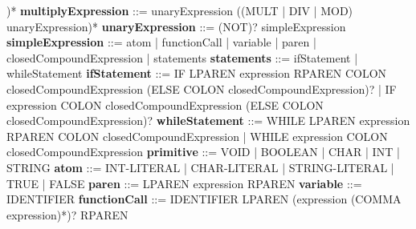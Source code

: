                                                   )*
\newline 
{\bf multiplyExpression}          ::= unaryExpression ((MULT | DIV | MOD) unaryExpression)*
\newline 
{\bf unaryExpression}             ::= (NOT)? simpleExpression
\newline   
{\bf simpleExpression}            ::= atom
                                    | functionCall
                                    | variable
                                    | paren
                                    | closedCompoundExpression
                                    | statements
\newline 
{\bf statements}                  ::= ifStatement
                                    | whileStatement
\newline 
{\bf ifStatement}                 ::= IF LPAREN expression RPAREN COLON closedCompoundExpression (ELSE COLON closedCompoundExpression)? 
                                    | IF expression COLON closedCompoundExpression (ELSE COLON closedCompoundExpression)?
\newline     
{\bf whileStatement}              ::= WHILE LPAREN expression RPAREN COLON closedCompoundExpression
                                    | WHILE expression COLON closedCompoundExpression
\newline    
{\bf primitive}                   ::= VOID
                                    | BOOLEAN
                                    | CHAR
                                    | INT
                                    | STRING
\newline 
{\bf atom}                        ::= INT-LITERAL
                                    | CHAR-LITERAL
                                    | STRING-LITERAL
                                    | TRUE 
                                    | FALSE
\newline 
{\bf paren}                       ::= LPAREN expression RPAREN
\newline   
{\bf variable}                    ::= IDENTIFIER 
\newline   
{\bf functionCall}                ::= IDENTIFIER LPAREN (expression (COMMA expression)*)? RPAREN 
